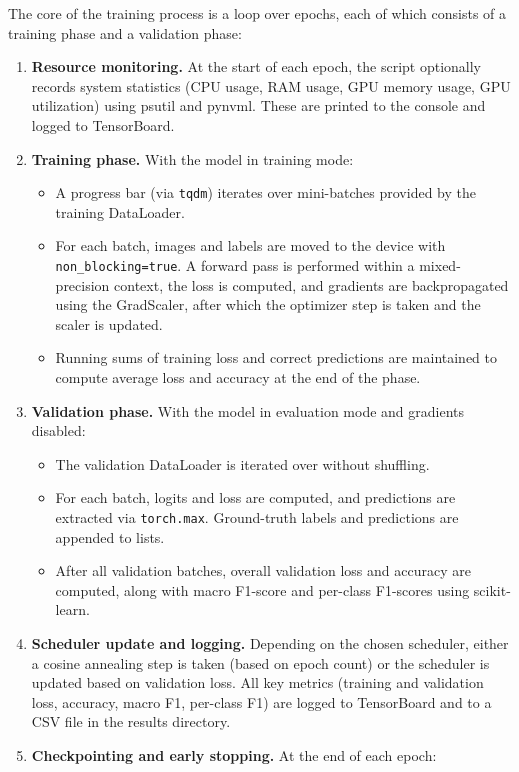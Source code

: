 The core of the training process is a loop over epochs, each of which consists of a training phase and a validation phase:
\begin{enumerate}
  \item \textbf{Resource monitoring.} At the start of each epoch, the script optionally records system statistics (CPU usage, RAM usage, GPU memory usage, GPU utilization) using psutil and pynvml. These are printed to the console and logged to TensorBoard.
  \item \textbf{Training phase.} With the model in training mode:
  \begin{itemize}
    \item A progress bar (via \texttt{tqdm}) iterates over mini-batches provided by the training DataLoader.
    \item For each batch, images and labels are moved to the device with \texttt{non\_blocking=true}. A forward pass is performed within a mixed-precision context, the loss is computed, and gradients are backpropagated using the GradScaler, after which the optimizer step is taken and the scaler is updated.
    \item Running sums of training loss and correct predictions are maintained to compute average loss and accuracy at the end of the phase.
  \end{itemize}
  \item \textbf{Validation phase.} With the model in evaluation mode and gradients disabled:
  \begin{itemize}
    \item The validation DataLoader is iterated over without shuffling.
    \item For each batch, logits and loss are computed, and predictions are extracted via \texttt{torch.max}. Ground-truth labels and predictions are appended to lists.
    \item After all validation batches, overall validation loss and accuracy are computed, along with macro F1-score and per-class F1-scores using scikit-learn.
  \end{itemize}
  \item \textbf{Scheduler update and logging.} Depending on the chosen scheduler, either a cosine annealing step is taken (based on epoch count) or the scheduler is updated based on validation loss. All key metrics (training and validation loss, accuracy, macro F1, per-class F1) are logged to TensorBoard and to a CSV file in the results directory.
  \item \textbf{Checkpointing and early stopping.} At the end of each epoch:

\end{enumerate}
